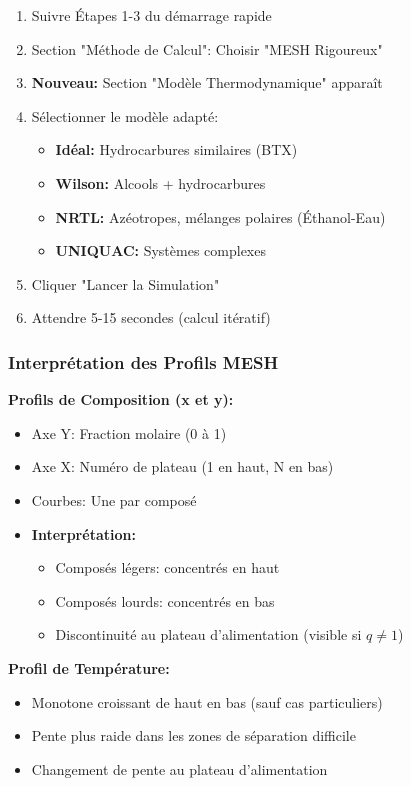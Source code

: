 \documentclass[11pt,a4paper]{article}
\begin{document}
\begin{enumerate}[leftmargin=*]
    \item Suivre Étapes 1-3 du démarrage rapide
    \item Section "Méthode de Calcul": Choisir "MESH Rigoureux"
    \item \textbf{Nouveau:} Section "Modèle Thermodynamique" apparaît
    \item Sélectionner le modèle adapté:
    \begin{itemize}
        \item \textbf{Idéal:} Hydrocarbures similaires (BTX)
        \item \textbf{Wilson:} Alcools + hydrocarbures
        \item \textbf{NRTL:} Azéotropes, mélanges polaires (Éthanol-Eau)
        \item \textbf{UNIQUAC:} Systèmes complexes
    \end{itemize}
    \item Cliquer "Lancer la Simulation"
    \item Attendre 5-15 secondes (calcul itératif)
\end{enumerate}

\subsubsection{Interprétation des Profils MESH}

\textbf{Profils de Composition (x et y):}

\begin{itemize}[leftmargin=*]
    \item Axe Y: Fraction molaire (0 à 1)
    \item Axe X: Numéro de plateau (1 en haut, N en bas)
    \item Courbes: Une par composé
    \item \textbf{Interprétation:}
    \begin{itemize}
        \item Composés légers: concentrés en haut
        \item Composés lourds: concentrés en bas
        \item Discontinuité au plateau d'alimentation (visible si $q \neq 1$)
    \end{itemize}
\end{itemize}

\textbf{Profil de Température:}

\begin{itemize}[leftmargin=*]
    \item Monotone croissant de haut en bas (sauf cas particuliers)
    \item Pente plus raide dans les zones de séparation difficile
    \item Changement de pente au plateau d'alimentation
\end{itemize}
\end{document}
